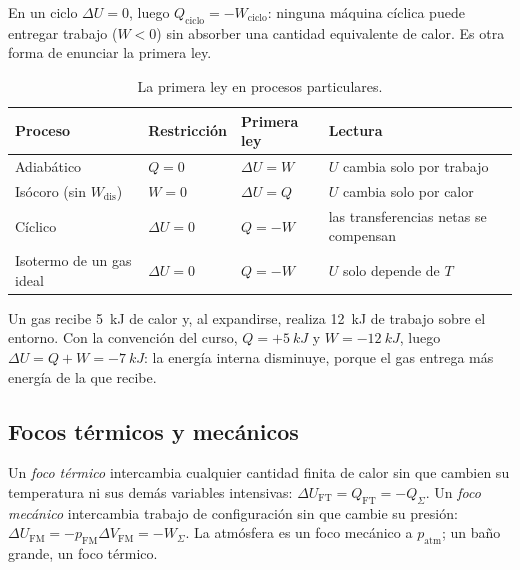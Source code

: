 \begin{observacion}
En un ciclo $\Delta U=0$, luego $Q_{\mathrm{ciclo}}=-W_{\mathrm{ciclo}}$: ninguna máquina cíclica puede entregar
trabajo ($W<0$) sin absorber una cantidad equivalente de calor. Es otra forma de enunciar la primera ley.
\end{observacion}

\begin{table}[htbp]
\centering
\caption{La primera ley en procesos particulares.}
\label{tab:procesos}
\small
\renewcommand{\arraystretch}{1.35}
\begin{tabular}{llll}
\toprule
Proceso & Restricción & Primera ley & Lectura\\
\midrule
Adiabático & $Q=0$ & $\Delta U=W$ & $U$ cambia solo por trabajo\\
Isócoro (sin $W_{\mathrm{dis}}$) & $W=0$ & $\Delta U=Q$ & $U$ cambia solo por calor\\
Cíclico & $\Delta U=0$ & $Q=-W$ & las transferencias netas se compensan\\
Isotermo de un gas ideal & $\Delta U=0$ & $Q=-W$ & $U$ solo depende de $T$\\
\bottomrule
\end{tabular}
\end{table}

\begin{ejemplo}
Un gas recibe \SI{5}{kJ} de calor y, al expandirse, realiza \SI{12}{kJ} de trabajo sobre el entorno. Con la
convención del curso, $Q=+\SI{5}{kJ}$ y $W=-\SI{12}{kJ}$, luego $\Delta U=Q+W=-\SI{7}{kJ}$: la energía interna
disminuye, porque el gas entrega más energía de la que recibe.
\end{ejemplo}

\subsection{Focos térmicos y mecánicos}

\begin{definicion}[Focos]
Un \emph{foco térmico} intercambia cualquier cantidad finita de calor sin que cambien su temperatura ni sus
demás variables intensivas: $\Delta U_{\mathrm{FT}}=Q_{\mathrm{FT}}=-Q_\Sigma$. Un \emph{foco mecánico} intercambia
trabajo de configuración sin que cambie su presión: $\Delta U_{\mathrm{FM}}=-p_{\mathrm{FM}}\Delta V_{\mathrm{FM}}=-W_\Sigma$.
La atmósfera es un foco mecánico a $p_{\mathrm{atm}}$; un baño grande, un foco térmico.
\end{definicion}

